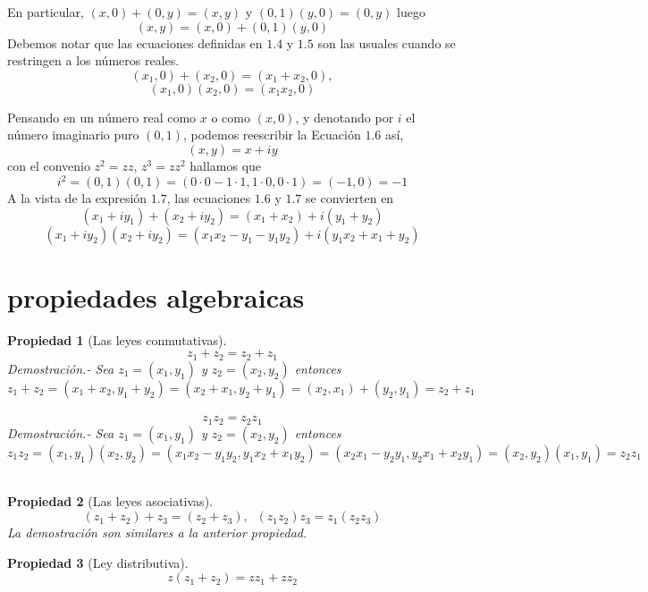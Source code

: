 \documentclass[10pt]{book}
\newtheorem{prop}{\large\textbf{Propiedad}}[part]
\begin{document}
En particular, $(x,0) + (0,y) = (x,y)$ y $(0,1)(y,0) = (0,y)$ luego 
\begin{equation}
(x,y) = (x,0) + (0,1)(y,0)
\end{equation}
Debemos notar que las ecuaciones definidas en $1.4$ y $1.5$ son las usuales cuando se restringen a los números reales.
$$(x_1,0)+(x_2,0) = (x_1+x_2,0),$$
$$(x_1,0)(x_2,0) = (x_1 x_2,0)$$  

Pensando en un número real como $x$ o como $(x,0)$, y denotando por $i$ el número imaginario puro $(0,1)$, podemos reescribir la Ecuación $1.6$ así,
\begin{equation}
(x,y)=x+iy
\end{equation}
con el convenio $z^2=zz$, $z^3=zz^2$ hallamos que $$i^2 = (0,1)(0,1) = (0\cdot 0 - 1\cdot 1,1\cdot 0, 0 \cdot 1) =(-1,0)= -1$$
A la vista de la expresión $1.7$, las ecuaciones $1.6$ y $1.7$ se convierten en
\begin{equation}
(x_1+iy_1)+(x_2+iy_2) = (x_1+x_2)+i(y_1+y_2)
\end{equation}
\begin{equation}
(x_1+iy_2)(x_2+iy_2)=(x_1 x_2 - y_1 - y_1 y_2)+i(y_1 x_2 + x_1 +y_2)
\end{equation}

\section{propiedades algebraicas}
\begin{tcolorbox}[colback = white]
\begin{prop}[Las leyes conmutativas]
$$z_1 + z_2 = z_2 + z_1 $$  
Demostración.- \; Sea $z_1=(x_1,y_1)$ y $z_2=(x_2,y_2)$ entonces $$z_1 + z_2 = (x_1+x_2,y_1+y_2) = (x_2+x_1,y_2+y_1) = (x_2,x_1)+(y_2,y_1) = z_2+z_1$$\\
$$ z_1 z_2=z_2 z_1$$
Demostración.- \; Sea $z_1=(x_1,y_1)$ y $z_2=(x_2,y_2)$ entonces
$$z_1 z_2 = (x_1,y_1)(x_2,y_2) = (x_1x_2 - y_1y_2,y_1x_2 + x_1y_2) = (x_2x_1 - y_2y_1,y_2x_1 + x_2y_1) = (x_2,y_2)(x_1,y_1) = z_2 z_1$$\\
\end{prop}
\begin{prop}[Las leyes asociativas]
$$(z_1+z_2)+z_3 = (z_2 + z_3), \; \; (z_1 z_2)z_3 = z_1(z_2 z_3)$$
La demostración son similares a la anterior propiedad.
\end{prop}
\begin{prop}[Ley distributiva]
$$z(z_1+z_2) = zz_1 + zz_2$$
\end{prop}
\end{tcolorbox}
\end{document}
